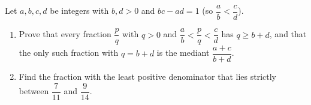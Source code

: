 Let $a,b,c,d$ be integers with $b,d>0$ and $bc-ad=1$ (so $\dfrac{a}{b}<\dfrac{c}{d}$).
\begin{enumerate}
\item[(a)] Prove that every fraction $\dfrac{p}{q}$ with $q>0$ and $\dfrac{a}{b}<\dfrac{p}{q}<\dfrac{c}{d}$ has $q\ge b+d$, and that the only such fraction with $q=b+d$ is the mediant $\dfrac{a+c}{b+d}$.
\item[(b)] Find the fraction with the least positive denominator that lies strictly between $\dfrac{7}{11}$ and $\dfrac{9}{14}$.
\end{enumerate}
